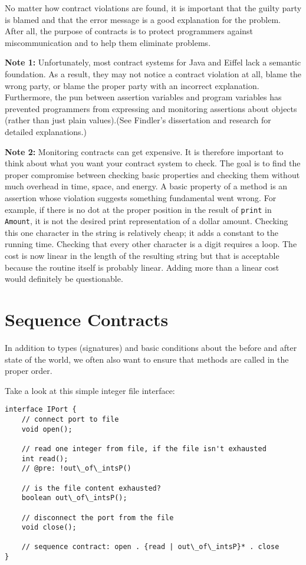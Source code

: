 \documentclass[11pt]{article}
\begin{document}
No matter how contract violations are found, it is important that the guilty
party is blamed and that the error message is a good explanation for the
problem. After all, the purpose of contracts is to protect programmers against
miscommunication and to help them eliminate problems. 


{\bf Note 1:} Unfortunately, most contract systems for Java and Eiffel lack
a semantic foundation. As a result, they may not notice a contract violation at
all, blame the wrong party, or blame the proper party with an incorrect
explanation. Furthermore, the pun between assertion variables and program
variables has prevented programmers from expressing and monitoring assertions
about objects (rather than just plain values).(See Findler's dissertation and
research for detailed explanations.)


{\bf Note 2:} Monitoring contracts can get expensive. It is therefore
important to think about what you want your contract system to check. The goal
is to find the proper compromise between checking basic properties and checking
them without much overhead in time, space, and energy. A basic property of a
method is an assertion whose violation suggests something fundamental went
wrong. For example, if there is no dot at the proper position in the result of
{\tt print} in {\tt Amount}, it is not the desired print
representation of a dollar amount. Checking this one character in the string is
relatively cheap; it adds a constant to the running time. Checking that every
other character is a digit requires a loop. The cost is now linear in the length
of the resulting string but that is acceptable because the routine itself is
probably linear. Adding more than a linear cost would definitely be
questionable.


\section{Sequence Contracts}

In addition to types (signatures) and basic conditions about the
before and after state of the world, we often also want to ensure
that methods are called in the proper order.

Take a look at this simple integer file interface:

\begin{verbatim}
interface IPort {
    // connect port to file
    void open(); 

    // read one integer from file, if the file isn't exhausted
    int read(); 
    // @pre: !out\_of\_intsP()

    // is the file content exhausted? 
    boolean out\_of\_intsP(); 

    // disconnect the port from the file 
    void close();     

    // sequence contract: open . {read | out\_of\_intsP}* . close
}
\end{verbatim}
\end{document}

